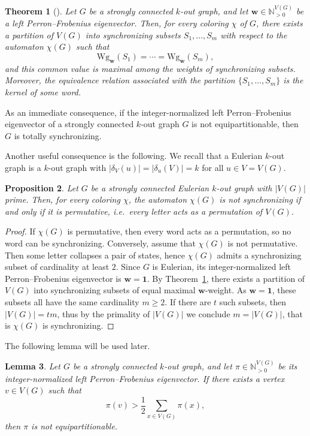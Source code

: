 \documentclass[a4paper,10pt]{amsart}
\theoremstyle{plain}
\newtheorem{theorem}{Theorem}[section]
\newtheorem{lemma}[theorem]{Lemma}
\newtheorem{proposition}[theorem]{Proposition}
\theoremstyle{definition}
\begin{document}
\begin{theorem}[\cite{Fr1990,GuPri}]\label{thm:friedman-weight}
Let $G$ be a strongly connected $k$-out graph, and let $\mathbf w\in\mathbb N_{>0}^{V(G)}$ be a left Perron--Frobenius eigenvector. Then, for every coloring $\chi$ of $G$, there exists a partition of $V(G)$ into synchronizing subsets $S_1,\dots,S_m$ with respect to the automaton $\chi(G)$ such that
\[
\mathrm{Wg}_{\mathbf w}(S_1)=\cdots=\mathrm{Wg}_{\mathbf w}(S_m),
\]
and this common value is maximal among the weights of synchronizing subsets. Moreover, the equivalence relation associated with the partition $\{S_1,\dots,S_m\}$ is the kernel of some word.
\end{theorem}

As an immediate consequence, if the integer-normalized left Perron--Frobenius eigenvector of a strongly connected $k$-out graph $G$ is not equipartitionable, then $G$ is totally synchronizing.

Another useful consequence is the following. We recall that a Eulerian $k$-out graph is a $k$-out graph with $|\delta_V(u)|=|\delta_u(V)|=k$ for all $u\in V=V(G)$. 

\begin{proposition}\label{lem:prime-eulerian-dichotomy}
Let $G$ be a strongly connected Eulerian $k$-out graph with $|V(G)|$ prime. Then, for every coloring $\chi$, the automaton $\chi(G)$ is not synchronizing if and only if it is permutative, i.e.\ every letter acts as a permutation of $V(G)$.
\end{proposition}

\begin{proof}
If $\chi(G)$ is permutative, then every word acts as a permutation, so no word can be synchronizing. Conversely, assume that $\chi(G)$ is not permutative. Then some letter collapses a pair of states, hence $\chi(G)$ admits a synchronizing subset of cardinality at least $2$. Since $G$ is Eulerian, its integer-normalized left Perron--Frobenius eigenvector is $\mathbf w=\mathbf 1$. By Theorem~\ref{thm:friedman-weight}, there exists a partition of $V(G)$ into synchronizing subsets of equal maximal $\mathbf w$-weight. As $\mathbf w=\mathbf 1$, these subsets all have the same cardinality $m\ge 2$. If there are $t$ such subsets, then $|V(G)|=tm$, thus by the primality of $|V(G)|$ we conclude $m=|V(G)|$, that is $\chi(G)$ is synchronizing. 
\end{proof}
The following lemma will be used later. 
\begin{lemma}\label{lem:pf-dominating-coordinate}
Let $G$ be a strongly connected $k$-out graph, and let $\pi\in\mathbb N_{>0}^{V(G)}$ be its integer-normalized left Perron--Frobenius eigenvector. If there exists a vertex $v\in V(G)$ such that
\[
\pi(v)>\frac12\sum_{x\in V(G)}\pi(x),
\]
then $\pi$ is not equipartitionable.
\end{lemma}
\end{document}
